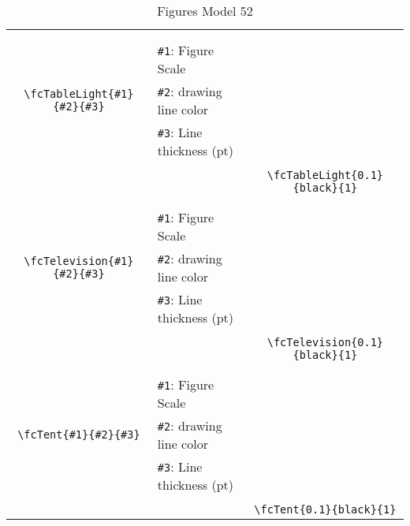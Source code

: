 \documentclass[x11names]{article}
\begin{document}
\begin{table}[H]
\begin{tabular}{|c|l|c|}
	&&\multirow{5}{*}{\fcTableLight{0.1}{black}{1}}\\	&&\\	&\verb|#1|: Figure Scale &\\	\verb|\fcTableLight{#1}{#2}{#3}|&	\verb|#2|: drawing line color &\\	&\verb|#3|: Line thickness (pt) &\\ &&\\&&	\verb|\fcTableLight{0.1}{black}{1}|\\\hline 	
	&&\multirow{5}{*}{\fcTelevision{0.1}{black}{1}}\\	&&\\	&\verb|#1|: Figure Scale &\\	\verb|\fcTelevision{#1}{#2}{#3}|&	\verb|#2|: drawing line color &\\	&\verb|#3|: Line thickness (pt) &\\ &&\\&&	\verb|\fcTelevision{0.1}{black}{1}|\\\hline 	
	&&\multirow{5}{*}{\fcTent{0.1}{black}{1}}\\	&&\\	&\verb|#1|: Figure Scale &\\	\verb|\fcTent{#1}{#2}{#3}|&	\verb|#2|: drawing line color &\\	&\verb|#3|: Line thickness (pt) &\\ &&\\&&	\verb|\fcTent{0.1}{black}{1}|\\\hline 	\hline\end{tabular}\caption{Figures Model 52}\label{tab52}\end{table}
\end{document}
